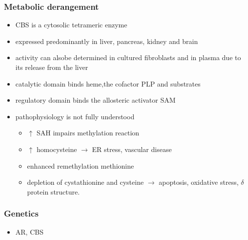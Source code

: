 \documentclass{scrartcl}
\begin{document}
\subsubsection{Metabolic derangement}
\label{sec:orgb6c8b9e}
\begin{itemize}
\item CBS is a cytosolic tetrameric enzyme
\item expressed predominantly in liver, pancreas, kidney and brain
\item activity can alsobe determined in cultured fibroblasts and in plasma
due to its release from the liver
\item catalytic domain binds heme,the cofactor PLP and substrates
\item regulatory domain binds the allosteric activator SAM
\item pathophysiology is not fully understood
\begin{itemize}
\item \(\uparrow\) SAH impairs methylation reaction
\item \(\uparrow\) homocysteine \(\to\) ER stress, vascular disease
\item enhanced remethylation methionine
\item depletion of cystathionine and cysteine \(\to\) apoptosis, oxidative stress, \(\delta\) protein structure.
\end{itemize}
\end{itemize}

\subsubsection{Genetics}
\label{sec:org11f05a0}
\begin{itemize}
\item AR, CBS
\end{itemize}
\end{document}
